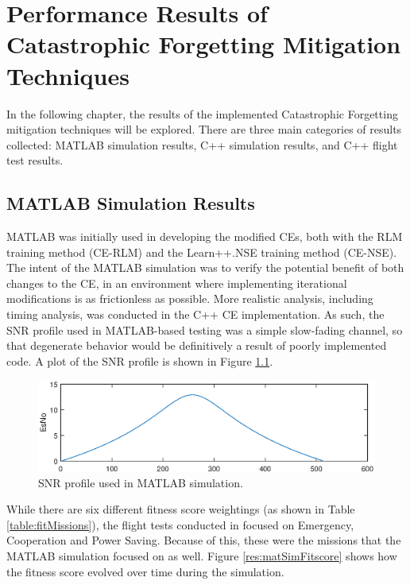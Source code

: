 \chapter{Performance Results of Catastrophic Forgetting Mitigation Techniques}\label{ch:results}

\par In the following chapter, the results of the implemented Catastrophic Forgetting mitigation techniques will be explored. There are three main categories of results collected: MATLAB simulation results, C++ simulation results, and C++ flight test results. %
\section{MATLAB Simulation Results}
\par MATLAB was initially used in developing the modified CEs, both with the RLM training method (CE-RLM) and the Learn++.NSE training method (CE-NSE). The intent of the MATLAB simulation was to verify the potential benefit of both changes to the CE, in an environment where implementing iterational modifications is as frictionless as possible. More realistic analysis, including timing analysis, was conducted in the C++ CE implementation. As such, the SNR profile used in MATLAB-based testing was a simple slow-fading channel, so that degenerate behavior would be definitively a result of poorly implemented code. A plot of the SNR profile is shown in Figure \ref{fig:matlabSNRProf}. 
\begin{figure}[ht]
\centering
\includegraphics[width=\linewidth]{figures/matlab_sim_results/snrPRofile_matlabsim.eps}
\caption{SNR profile used in MATLAB simulation.}
\label{fig:matlabSNRProf}
\end{figure}
\par While there are six different fitness score weightings (as shown in Table \ref{table:fitMissions}), the flight tests conducted in \cite{tim_implementation_paper} focused on Emergency, Cooperation and Power Saving. Because of this, these were the missions that the MATLAB simulation focused on as well. Figure \ref{res:matSimFitscore} shows how the fitness score evolved over time during the simulation.

